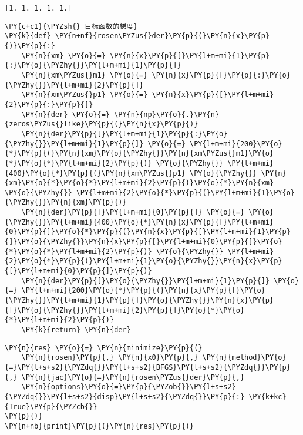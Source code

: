     \begin{Verbatim}[commandchars=\\\{\}]
[1. 1. 1. 1. 1.]
    \end{Verbatim}

    \begin{tcolorbox}[breakable, size=fbox, boxrule=1pt, pad at break*=1mm,colback=cellbackground, colframe=cellborder]
\begin{Verbatim}[commandchars=\\\{\}]
\PY{c+c1}{\PYZsh{} 目标函数的梯度}
\PY{k}{def} \PY{n+nf}{rosen\PYZus{}der}\PY{p}{(}\PY{n}{x}\PY{p}{)}\PY{p}{:}
    \PY{n}{xm} \PY{o}{=} \PY{n}{x}\PY{p}{[}\PY{l+m+mi}{1}\PY{p}{:}\PY{o}{\PYZhy{}}\PY{l+m+mi}{1}\PY{p}{]}
    \PY{n}{xm\PYZus{}m1} \PY{o}{=} \PY{n}{x}\PY{p}{[}\PY{p}{:}\PY{o}{\PYZhy{}}\PY{l+m+mi}{2}\PY{p}{]}
    \PY{n}{xm\PYZus{}p1} \PY{o}{=} \PY{n}{x}\PY{p}{[}\PY{l+m+mi}{2}\PY{p}{:}\PY{p}{]}
    \PY{n}{der} \PY{o}{=} \PY{n}{np}\PY{o}{.}\PY{n}{zeros\PYZus{}like}\PY{p}{(}\PY{n}{x}\PY{p}{)}
    \PY{n}{der}\PY{p}{[}\PY{l+m+mi}{1}\PY{p}{:}\PY{o}{\PYZhy{}}\PY{l+m+mi}{1}\PY{p}{]} \PY{o}{=} \PY{l+m+mi}{200}\PY{o}{*}\PY{p}{(}\PY{n}{xm}\PY{o}{\PYZhy{}}\PY{n}{xm\PYZus{}m1}\PY{o}{*}\PY{o}{*}\PY{l+m+mi}{2}\PY{p}{)} \PY{o}{\PYZhy{}} \PY{l+m+mi}{400}\PY{o}{*}\PY{p}{(}\PY{n}{xm\PYZus{}p1} \PY{o}{\PYZhy{}} \PY{n}{xm}\PY{o}{*}\PY{o}{*}\PY{l+m+mi}{2}\PY{p}{)}\PY{o}{*}\PY{n}{xm} \PY{o}{\PYZhy{}} \PY{l+m+mi}{2}\PY{o}{*}\PY{p}{(}\PY{l+m+mi}{1}\PY{o}{\PYZhy{}}\PY{n}{xm}\PY{p}{)}
    \PY{n}{der}\PY{p}{[}\PY{l+m+mi}{0}\PY{p}{]} \PY{o}{=} \PY{o}{\PYZhy{}}\PY{l+m+mi}{400}\PY{o}{*}\PY{n}{x}\PY{p}{[}\PY{l+m+mi}{0}\PY{p}{]}\PY{o}{*}\PY{p}{(}\PY{n}{x}\PY{p}{[}\PY{l+m+mi}{1}\PY{p}{]}\PY{o}{\PYZhy{}}\PY{n}{x}\PY{p}{[}\PY{l+m+mi}{0}\PY{p}{]}\PY{o}{*}\PY{o}{*}\PY{l+m+mi}{2}\PY{p}{)} \PY{o}{\PYZhy{}} \PY{l+m+mi}{2}\PY{o}{*}\PY{p}{(}\PY{l+m+mi}{1}\PY{o}{\PYZhy{}}\PY{n}{x}\PY{p}{[}\PY{l+m+mi}{0}\PY{p}{]}\PY{p}{)}
    \PY{n}{der}\PY{p}{[}\PY{o}{\PYZhy{}}\PY{l+m+mi}{1}\PY{p}{]} \PY{o}{=} \PY{l+m+mi}{200}\PY{o}{*}\PY{p}{(}\PY{n}{x}\PY{p}{[}\PY{o}{\PYZhy{}}\PY{l+m+mi}{1}\PY{p}{]}\PY{o}{\PYZhy{}}\PY{n}{x}\PY{p}{[}\PY{o}{\PYZhy{}}\PY{l+m+mi}{2}\PY{p}{]}\PY{o}{*}\PY{o}{*}\PY{l+m+mi}{2}\PY{p}{)}
    \PY{k}{return} \PY{n}{der}
\end{Verbatim}
\end{tcolorbox}

    \begin{tcolorbox}[breakable, size=fbox, boxrule=1pt, pad at break*=1mm,colback=cellbackground, colframe=cellborder]
\begin{Verbatim}[commandchars=\\\{\}]
\PY{n}{res} \PY{o}{=} \PY{n}{minimize}\PY{p}{(}
    \PY{n}{rosen}\PY{p}{,} \PY{n}{x0}\PY{p}{,} \PY{n}{method}\PY{o}{=}\PY{l+s+s2}{\PYZdq{}}\PY{l+s+s2}{BFGS}\PY{l+s+s2}{\PYZdq{}}\PY{p}{,} \PY{n}{jac}\PY{o}{=}\PY{n}{rosen\PYZus{}der}\PY{p}{,}
    \PY{n}{options}\PY{o}{=}\PY{p}{\PYZob{}}\PY{l+s+s2}{\PYZdq{}}\PY{l+s+s2}{disp}\PY{l+s+s2}{\PYZdq{}}\PY{p}{:} \PY{k+kc}{True}\PY{p}{\PYZcb{}}
\PY{p}{)}
\PY{n+nb}{print}\PY{p}{(}\PY{n}{res}\PY{p}{)}
\end{Verbatim}
\end{tcolorbox}

